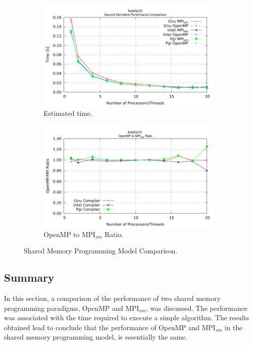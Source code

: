 \begin{figure} [t!]
    \centering
    \captionsetup{justification=centering, singlelinecheck=false}
    \begin{subfigure}{.6\textwidth}
      \centering
      \hspace*{-1.5cm} 
      \includegraphics[width=0.95\linewidth]{Plots/FirstTouch/koelsch.pdf}
      \caption[]{Estimated time.}
      \label{fig:sharedMemoryComparison3}
    \end{subfigure}%
    \begin{subfigure}{.6\textwidth}
      \centering
      \hspace*{-1.5cm} 
      \includegraphics[width=0.95\linewidth]{Plots/FirstTouch/koelschRatio.pdf}
      \caption{OpenMP to MPI$_{sm}$ Ratio.}
      \label{fig:sharedMemoryRatioComparison3}
    \end{subfigure}%
\caption{Shared Memory Programming Model Comparison.}
\label{fig:sharedMemoryProgrammingModel3}
\end{figure}




\subsection*{Summary}

In this section, a comparison of the performance of two shared memory programming paradigms, OpenMP and MPI$_{sm}$, was discussed. The performance was associated with the time required to execute a simple algorithm. The results obtained lead to conclude that the performance of OpenMP and MPI$_{sm}$ in the shared memory programming model, is essentially the same.
